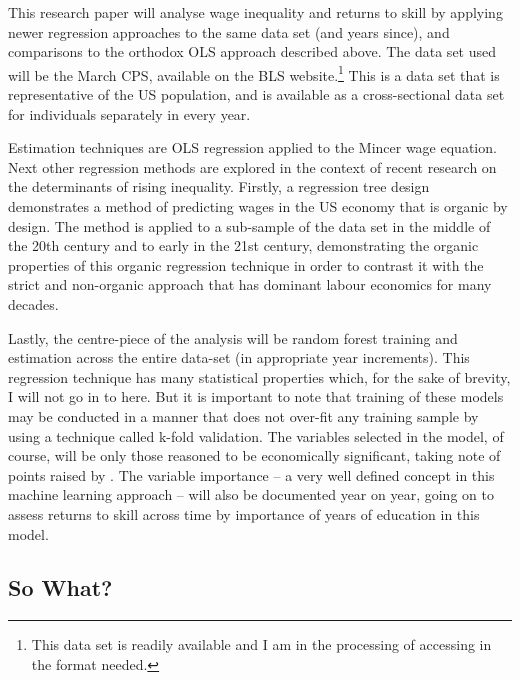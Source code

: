 \documentclass[notitlepage,12pt]{article}
\begin{document}
This research paper will analyse wage inequality and returns to skill by applying newer regression approaches to the same data set (and years since), and comparisons to the orthodox OLS approach described above. The data set used will be the March CPS, available on the BLS website.\footnote{This data set is readily available and I am in the processing of accessing in the format needed.}  This is a data set that is representative of the US population, and is available as a cross-sectional data set for individuals separately in every year.  

Estimation techniques are OLS regression applied to the Mincer wage equation.  Next other regression methods are explored in the context of recent research on the determinants of rising inequality.  Firstly, a regression tree design demonstrates a method of predicting wages in the US economy that is organic by design.  The method is applied to a sub-sample of the data set in the middle of the 20th century and to early in the 21st century, demonstrating the organic properties of this organic regression technique in order to contrast it with the strict and non-organic approach that has dominant labour economics for many decades. 

Lastly, the centre-piece of the analysis will be random forest training and estimation across the entire data-set (in appropriate year increments).  This regression technique has many statistical properties which, for the sake of brevity, I will not go in to here.  But it is important to note that training of these models may be conducted in a manner that does not over-fit any training sample by using a technique called k-fold validation.  The variables selected in the model, of course, will be only those reasoned to be economically significant, taking note of points raised by \cite{mullainathan2017machine}.  The variable importance -- a very well defined concept in this machine learning approach -- will also be documented year on year, going on to assess returns to skill across time by importance of years of education in this model.

\subsection{So What?}
\end{document}
